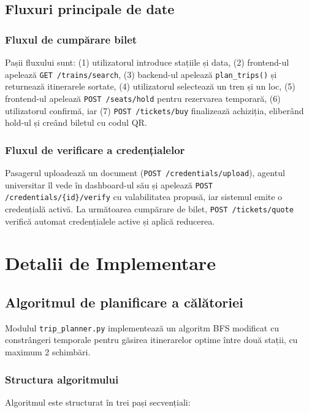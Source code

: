 \documentclass[12pt,a4paper]{report}
\begin{document}
\section{Fluxuri principale de date}

\subsection{Fluxul de cumpărare bilet}

Pașii fluxului sunt: (1) utilizatorul introduce stațiile și data, (2) frontend-ul apelează \texttt{GET /trains/search}, (3) backend-ul apelează \texttt{plan\_trips()} și returnează itinerarele sortate, (4) utilizatorul selectează un tren și un loc, (5) frontend-ul apelează \texttt{POST /seats/hold} pentru rezervarea temporară, (6) utilizatorul confirmă, iar (7) \texttt{POST /tickets/buy} finalizează achiziția, eliberând hold-ul și creând biletul cu codul QR.

\subsection{Fluxul de verificare a credențialelor}

Pasagerul uploadează un document (\texttt{POST /credentials/upload}), agentul universitar îl vede în dashboard-ul său și apelează \texttt{POST /credentials/\{id\}/verify} cu valabilitatea propusă, iar sistemul emite o credențială activă. La următoarea cumpărare de bilet, \texttt{POST /tickets/quote} verifică automat credențialele active și aplică reducerea.


\chapter{Detalii de Implementare}

\section{Algoritmul de planificare a călătoriei}

Modulul \texttt{trip\_planner.py} implementează un algoritm BFS modificat cu constrângeri temporale pentru găsirea itinerarelor optime între două stații, cu maximum 2 schimbări.

\subsection{Structura algoritmului}

Algoritmul este structurat în trei pași secvențiali:
\end{document}
